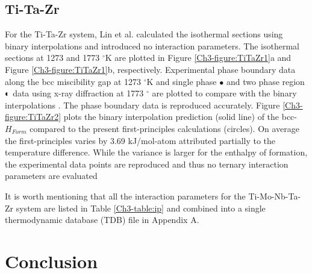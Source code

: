 \subsection{Ti-Ta-Zr}

For the Ti-Ta-Zr system, Lin et al. \cite{Lin1996} calculated the isothermal sections using binary interpolations and introduced no interaction parameters. The isothermal sections at 1273 and 1773 $^{\circ}$K are plotted in Figure \ref{Ch3-figure:TiTaZr1}a and Figure \ref{Ch3-figure:TiTaZr1}b, respectively. Experimental phase boundary data along the bcc miscibility gap at 1273 $^{\circ}$K and single phase $\bullet$ and two phase region $\LEFTcircle$ data using x-ray diffraction at 1773 $^{\circ}$ are plotted to compare with the binary interpolations \cite{Lin1996,Hoch1964}. The phase boundary data is reproduced accurately. Figure \ref{Ch3-figure:TiTaZr2} plots the binary interpolation prediction (solid line) of the bcc-$H_{Form}$ compared to the present first-principles calculations (circles). On average the first-principles varies by 3.69 kJ/mol-atom attributed partially to the temperature difference. While the variance is larger for the enthalpy of formation, the experimental data points \cite{Lin1996} are reproduced and thus no ternary interaction parameters are evaluated

It is worth mentioning that all the interaction parameters for the Ti-Mo-Nb-Ta-Zr system are listed in Table \ref{Ch3-table:ip} and combined into a single thermodynamic database (TDB) file in Appendix A.

\section{Conclusion}

